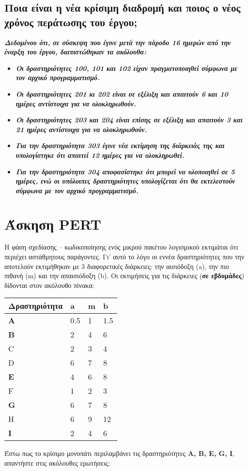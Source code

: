 \documentclass[12pt]{turabian-researchpaper}
\begin{document}
\subsection{Ποια είναι η νέα κρίσιμη διαδρομή και ποιος ο νέος χρόνος περάτωσης του έργου;}
\textit{\textbf{Δεδομένου ότι, σε σύσκεψη που έγινε μετά την πάροδο 16 ημερών από την έναρξη του έργου, διαπιστώθηκαν τα ακόλουθα:}}
\begin{itemize}
    \item \textit{\textbf{Οι δραστηριότητες 100, 101 και 102 είχαν πραγματοποιηθεί σύμφωνα με τον αρχικό προγραμματισμό.}}
    \item \textit{\textbf{Οι δραστηριότητες 201 κι 202 είναι σε εξέλιξη και απαιτούν 6 και 10 ημέρες αντίστοιχα για να ολοκληρωθούν.}}
    \item \textit{\textbf{Οι δραστηριότητες 203 και 204 είναι επίσης σε εξέλιξη και απαιτούν 3 και 21 ημέρες αντίστοιχα για να ολοκληρωθούν.}}
    \item \textit{\textbf{Για την δραστηριότητα 303 έγινε νέα εκτίμηση της διάρκειάς της και υπολογίστηκε ότι απαιτεί 12 ημέρες για να ολοκληρωθεί.}}
    \item \textit{\textbf{Για την δραστηριότητα 304 αποφασίστηκε ότι μπορεί να υλοποιηθεί σε 5 ημέρες, ενώ οι υπόλοιπες δραστηριότητες υπολογίζεται ότι θα εκτελεστούν σύμφωνα με τον αρχικό προγραμματισμό.}}
\end{itemize}

\section{Άσκηση PERT}
Η φάση σχεδίασης -- κωδικοποίησης ενός μικρού πακέτου λογισμικού εκτιμάται ότι περιέχει αστάθμητους παράγοντες. Γι' αυτό το λόγο οι εννέα δραστηριότητες που την αποτελούν εκτιμήθηκαν με 3 διαφορετικές διάρκειες: την αισιόδοξη (a), την πιο πιθανή (m) και την απαισιόδοξη (b).
Οι εκτιμήσεις για τις διάρκειες (\textbf{σε εβδομάδες}) δίδονται στον ακόλουθο πίνακα:
\begin{table}[]
    \centering
    \begin{tabular}{llll}
        \hline
        Δραστηριότητα & a   & m & b   \\ \hline
        \textbf{A}    & 0.5 & 1 & 1.5 \\
        \textbf{B}    & 2   & 4 & 6   \\
        C             & 2   & 3 & 4   \\
        D             & 6   & 7 & 8   \\
        \textbf{E}    & 4   & 6 & 8   \\
        F             & 1   & 2 & 3   \\
        \textbf{G}    & 6   & 7 & 8   \\
        H             & 6   & 9 & 12  \\
        \textbf{I}    & 2   & 4 & 6   \\ \hline
    \end{tabular}
\end{table}\newline
Έστω πως το κρίσιμο μονοπάτι περιλαμβάνει τις δραστηριότητες \textbf{A, B, E, G, I}, απαντήστε στις ακόλουθες ερωτήσεις:
\end{document}
